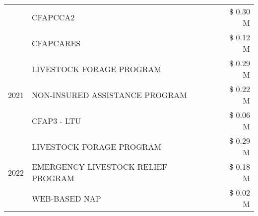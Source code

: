 \begin{tabular}{llr}
 & CFAPCCA2 & \$ 0.30 M \\
 & CFAPCARES & \$ 0.12 M \\
\cline{1-3}
\multirow[t]{3}{*}{2021} & LIVESTOCK FORAGE PROGRAM & \$ 0.29 M \\
 & NON-INSURED ASSISTANCE PROGRAM & \$ 0.22 M \\
 & CFAP3 - LTU & \$ 0.06 M \\
\cline{1-3}
\multirow[t]{3}{*}{2022} & LIVESTOCK FORAGE PROGRAM & \$ 0.29 M \\
 & EMERGENCY LIVESTOCK RELIEF PROGRAM & \$ 0.18 M \\
 & WEB-BASED NAP & \$ 0.02 M \\
\cline{1-3}
\bottomrule
\end{tabular}
